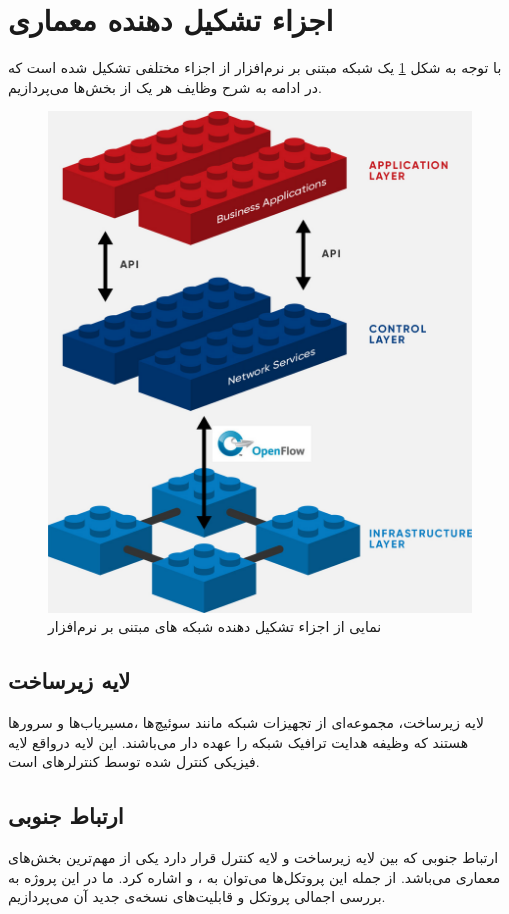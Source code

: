 \section{اجزاء تشکیل دهنده معماری }
با توجه به شکل \ref{fig2} یک شبکه مبتنی بر نرم‌افزار از اجزاء مختلفی تشکیل شده است که در ادامه به شرح وظایف هر یک از بخش‌ها می‌پردازیم.
\begin{figure}
	\centering
	\includegraphics[scale=0.2]{imgs/sdn-architecture-img.jpg}
	\caption{نمایی از اجزاء تشکیل دهنده شبکه های مبتنی بر نرم‌افزار}
	\label{fig2}
\end{figure}

\subsection{لایه زیرساخت}
لایه زیرساخت، مجموعه‌ای از تجهیزات شبکه مانند سوئیچ‌ها ،مسیریاب‌ها و سرور‌ها هستند که وظیفه هدایت ترافیک شبکه را عهده دار می‌باشند. این لایه درواقع لایه فیزیکی کنترل شده توسط کنترلرهای  است.

\subsection{ارتباط جنوبی}
ارتباط جنوبی که بین لایه زیرساخت و لایه کنترل قرار دارد یکی از مهم‌ترین بخش‌های معماری  می‌باشد. از جمله این پروتکل‌‌ها می‌توان به  ،  و  اشاره کرد. ما در این پروژه به بررسی اجمالی پروتکل  و قابلیت‌های نسخه‌ی جدید آن می‌پردازیم.

